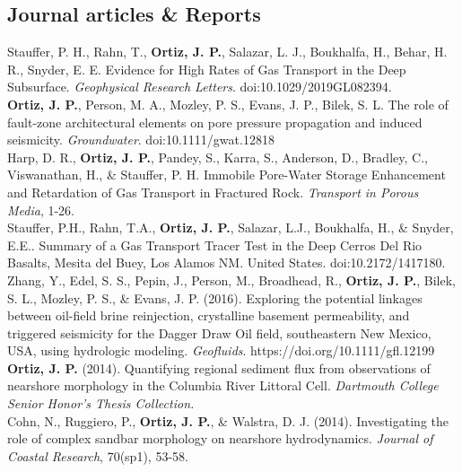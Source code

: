 \documentclass[11pt, letterpaper]{article}
\newcommand{\amper}{{\fontspec[Scale=.95]{Adobe Caslon Pro}\selectfont\itshape\&}}
\newcommand{\years}[1]{\marginnote{\scriptsize #1}}
\begin{document}
\subsection*{Journal articles \& Reports}
\noindent
\years{2019}Stauffer, P. H., Rahn, T., \textbf{Ortiz, J. P.}, Salazar, L. J., Boukhalfa, H., Behar, H. R., Snyder, E. E. Evidence for High Rates of Gas Transport in the Deep Subsurface. \emph{Geophysical Research Letters}. doi:10.1029/2019GL082394.\\
\years{2018}\textbf{Ortiz, J. P.}, Person, M. A., Mozley, P. S., Evans, J. P., Bilek, S. L. The role of fault-zone architectural elements on pore pressure propagation and induced seismicity. \emph{Groundwater}. doi:10.1111/gwat.12818\\
\years{2018}Harp, D. R., \textbf{Ortiz, J. P.}, Pandey, S., Karra, S., Anderson, D., Bradley, C., Viswanathan, H., \& Stauffer, P. H. Immobile Pore-Water Storage Enhancement and Retardation of Gas Transport in Fractured Rock. \emph{Transport in Porous Media}, 1-26.\\
\years{2018}Stauffer, P.H., Rahn, T.A., \textbf{Ortiz, J. P.}, Salazar, L.J., Boukhalfa, H., \& Snyder, E.E.. Summary of a Gas Transport Tracer Test in the Deep Cerros Del Rio Basalts, Mesita del Buey, Los Alamos NM. United States. doi:10.2172/1417180.\\
\years{2016}Zhang, Y., Edel, S. S., Pepin, J., Person, M., Broadhead, R., \textbf{Ortiz, J. P.}, Bilek, S. L., Mozley, P. S., \& Evans, J. P. (2016). Exploring the potential linkages between oil-field brine reinjection, crystalline basement permeability, and triggered seismicity for the Dagger Draw Oil field, southeastern New Mexico, USA, using hydrologic modeling. \emph{Geofluids}. https://doi.org/10.1111/gfl.12199\\ 
\years{2014}\textbf{Ortiz, J. P.} (2014). Quantifying regional sediment flux from observations of nearshore morphology in the Columbia River Littoral Cell. \emph{Dartmouth College Senior Honor's Thesis Collection.}\\
\years{2014}Cohn, N., Ruggiero, P., \textbf{Ortiz, J. P.}, \& Walstra, D. J. (2014). Investigating the role of complex sandbar morphology on nearshore hydrodynamics. \emph{Journal of Coastal Research}, 70(sp1), 53-58.

\end{document}
